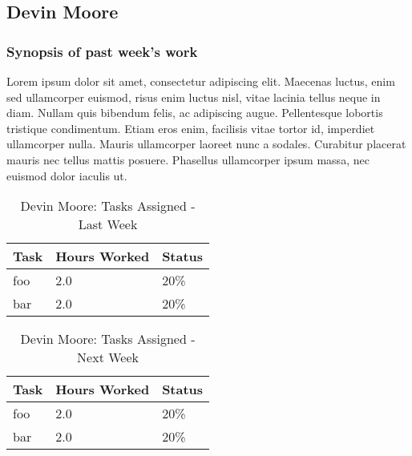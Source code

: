 \documentclass[12pt,article,compsoc]{IEEEtran}
\begin{document}
\subsection{Devin Moore}

	\subsubsection*{Synopsis of past week's work}

	Lorem ipsum dolor sit amet, consectetur adipiscing elit. Maecenas luctus, enim sed ullamcorper euismod, risus enim luctus nisl, vitae lacinia tellus neque in diam. Nullam quis bibendum felis, ac adipiscing augue. Pellentesque lobortis tristique condimentum. Etiam eros enim, facilisis vitae tortor id, imperdiet ullamcorper nulla. Mauris ullamcorper laoreet nunc a sodales. Curabitur placerat mauris nec tellus mattis posuere. Phasellus ullamcorper ipsum massa, nec euismod dolor iaculis ut.


	\begin{table}[ht]
	\renewcommand{\arraystretch}{1.3}
		\caption{Devin Moore: Tasks Assigned - Last Week}
		
		\label{Summary of Devin Moore's activities: last week}
		
		\centering
		\begin{tabular}{p{5.5cm}|p{1cm}|p{1cm}}

		\hline
		\bfseries 	Task		 		& \bfseries Hours Worked	& \bfseries Status	\\
		\hline\hline
					foo					& 2.0						& 20\%				\\	%
					bar					& 2.0						& 20\%				\\	
		\hline
		\end{tabular}
	\end{table}

	\begin{table}[ht]
	\renewcommand{\arraystretch}{1.3}
		\caption{Devin Moore: Tasks Assigned - Next Week}
		
		\label{Summary of Devin Moore's activites: this week}
		
		\centering
		\begin{tabular}{p{5.5cm}|p{1cm}|p{1cm}}

		\hline
		\bfseries 	Task		 		& \bfseries Hours Worked	& \bfseries Status	\\
		\hline\hline
					foo					& 2.0						& 20\%				\\	%
					bar					& 2.0						& 20\%				\\	
		\hline
		\end{tabular}
	\end{table}
\end{document}
